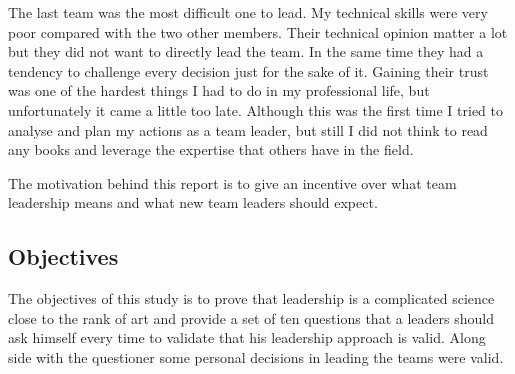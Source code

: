The last team was the most difficult one to lead. My technical skills were very poor compared with the two other members. Their technical opinion matter a lot but they did not want to directly lead the team. In the same time they had a tendency to challenge every decision just for the sake of it. Gaining their trust was one of the hardest things I had to do in my professional life, but unfortunately it came a little too late. Although this was the first time I tried to analyse and plan my actions as a team leader, but still I did not think to read any books and leverage the expertise that others have in the field.

The motivation behind this report is to give an incentive over what team leadership means and what new team leaders should expect.

\subsection{Objectives}
\label{sub-sec:objectives}

The objectives of this study is to prove that leadership is a complicated science close to the rank of art and provide a set of ten questions that a leaders should ask himself every time to validate that his leadership approach is valid. 
Along side with the questioner some personal decisions in leading the teams were valid.